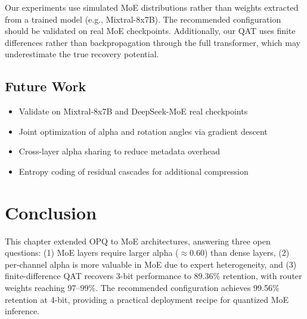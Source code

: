 Our experiments use simulated MoE distributions rather than weights extracted
from a trained model (e.g., Mixtral-8x7B). The recommended configuration should
be validated on real MoE checkpoints. Additionally, our QAT uses finite
differences rather than backpropagation through the full transformer, which
may underestimate the true recovery potential.

\subsection{Future Work}

\begin{itemize}
\item Validate on Mixtral-8x7B and DeepSeek-MoE real checkpoints
\item Joint optimization of alpha and rotation angles via gradient descent
\item Cross-layer alpha sharing to reduce metadata overhead
\item Entropy coding of residual cascades for additional compression
\end{itemize}

\section{Conclusion}

This chapter extended OPQ to MoE architectures, answering three open questions:
(1) MoE layers require larger alpha ($\approx 0.60$) than dense layers,
(2) per-channel alpha is more valuable in MoE due to expert heterogeneity,
and (3) finite-difference QAT recovers 3-bit performance to 89.36\% retention,
with router weights reaching 97--99\%. The recommended configuration achieves
99.56\% retention at 4-bit, providing a practical deployment recipe for
quantized MoE inference.
